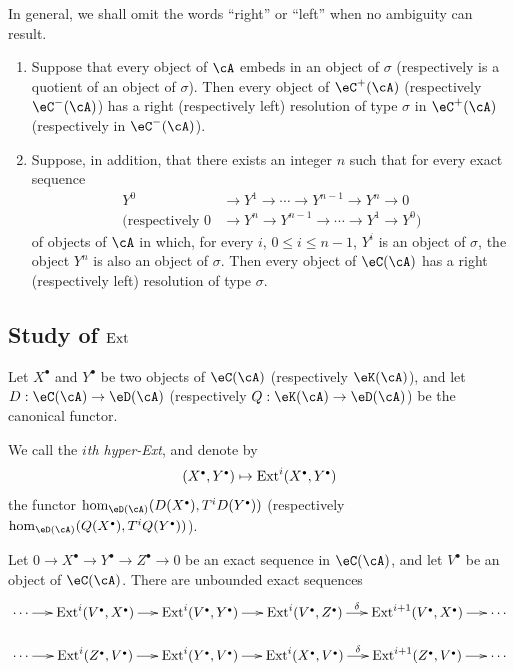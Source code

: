 In general, we shall omit the words “right” or “left” when no ambiguity
can result.

\begin{proposition}\label{VIII:3-1-9}
\begin{enumerate}
  \item Suppose that every object of $\cA$ embeds in an object of $\sigma$
    (respectively is a quotient of an object of $\sigma$). Then every
    object of $\eC^+(\cA)$ (respectively $\eC^-(\cA)$) has a right
    (respectively left) resolution of type $\sigma$ in $\eC^+(\cA)$
    (respectively in $\eC^-(\cA)$).
  \item Suppose, in addition, that there exists an integer $n$ such that
    for every exact sequence
    \begin{align*}
      Y^0 &\to Y^1 \to \cdots \to Y^{n-1} \to Y^n \to 0 \\
      \text{(respectively } 0 &\to Y^n \to Y^{n-1} \to \cdots \to Y^1 \to Y^0 \text{)}
    \end{align*}
    of objects of $\cA$ in which, for every $i$, $0\leqslant i\leqslant n-1$,
    $Y^i$ is an object of $\sigma$, the object $Y^n$ is also an object of
    $\sigma$. Then every object of $\eC(\cA)$ has a right (respectively
    left) resolution of type $\sigma$.
\end{enumerate}
\end{proposition}

\subsection{Study of $\operatorname{Ext}$}\label{VIII:3-2}

Let $X^\bullet$ and $Y^\bullet$ be two objects of $\eC(\cA)$
(respectively $\eK(\cA)$), and let
$D:\eC(\cA) \to \eD(\cA)$ (respectively
$Q:\eK(\cA) \to \eD(\cA)$) be the canonical functor.

\begin{definition}\label{VIII:3-2-1}
We call the \emph{$i$th hyper-Ext}, and denote by
\[
  (X^\bullet,Y^\bullet)\mapsto \ext^i(X^\bullet,Y^\bullet)
\]
the functor $\hom_{\eD(\cA)}(D(X^\bullet),T^i D(Y^\bullet))$
(respectively
$\hom_{\eD(\cA)}(Q(X^\bullet),T^i Q(Y^\bullet))$).
\end{definition}

\begin{proposition}\label{VIII:3-2-2}
Let $0 \to X^\bullet \to Y^\bullet \to Z^\bullet \to 0$ be an exact
sequence in $\eC(\cA)$, and let $V^\bullet$ be an object of $\eC(\cA)$.
There are unbounded exact sequences
\[\xymatrix@=0.5cm{
  \cdots \ar[r]
    & \ext^i(V^\bullet,X^\bullet) \ar[r]
    & \ext^i(V^\bullet,Y^\bullet) \ar[r]
    & \ext^i(V^\bullet,Z^\bullet) \ar[r]^-\delta
    & \ext^{i+1}(V^\bullet,X^\bullet) \ar[r]
    & \cdots \\
  \cdots \ar[r]
    & \ext^i(Z^\bullet,V^\bullet) \ar[r]
    & \ext^i(Y^\bullet,V^\bullet) \ar[r]
    & \ext^i(X^\bullet,V^\bullet) \ar[r]^-\delta
    & \ext^{i+1}(Z^\bullet,V^\bullet) \ar[r]
    & \cdots
}\]
\end{proposition}

